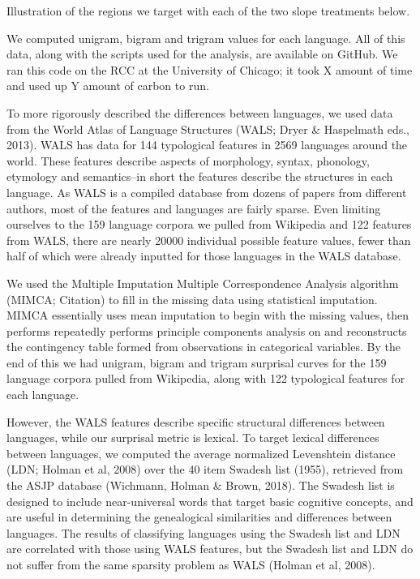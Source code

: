 \documentclass[11pt,]{article}
\begin{document}
Illustration of the regions we target with each of the two slope treatments below.

We computed unigram, bigram and trigram values for each language. All of this data, along with the scripts used for the analysis, are available on GitHub. We ran this code on the RCC at the University of Chicago; it took X amount of time and used up Y amount of carbon to run.

To more rigorously described the differences between languages, we used data from the World Atlas of Language Structures (WALS; Dryer \& Haspelmath eds., 2013). WALS has data for 144 typological features in 2569 languages around the world. These features describe aspects of morphology, syntax, phonology, etymology and semantics--in short the features describe the structures in each language. As WALS is a compiled database from dozens of papers from different authors, most of the features and languages are fairly sparse. Even limiting ourselves to the 159 language corpora we pulled from Wikipedia and 122 features from WALS, there are nearly 20000 individual possible feature values, fewer than half of which were already inputted for those languages in the WALS database.

We used the Multiple Imputation Multiple Correspondence Analysis algorithm (MIMCA; Citation) to fill in the missing data using statistical imputation. MIMCA essentially uses mean imputation to begin with the missing values, then performs repeatedly performs principle components analysis on and reconstructs the contingency table formed from observations in categorical variables. By the end of this we had unigram, bigram and trigram surprisal curves for the 159 language corpora pulled from Wikipedia, along with 122 typological features for each language.

However, the WALS features describe specific structural differences between languages, while our surprisal metric is lexical. To target lexical differences between languages, we computed the average normalized Levenshtein distance (LDN; Holman et al, 2008) over the 40 item Swadesh list (1955), retrieved from the ASJP database (Wichmann, Holman \& Brown, 2018). The Swadesh list is designed to include near-universal words that target basic cognitive concepts, and are useful in determining the genealogical similarities and differences between languages. The results of classifying languages using the Swadesh list and LDN are correlated with those using WALS features, but the Swadesh list and LDN do not suffer from the same sparsity problem as WALS (Holman et al, 2008).
\end{document}
